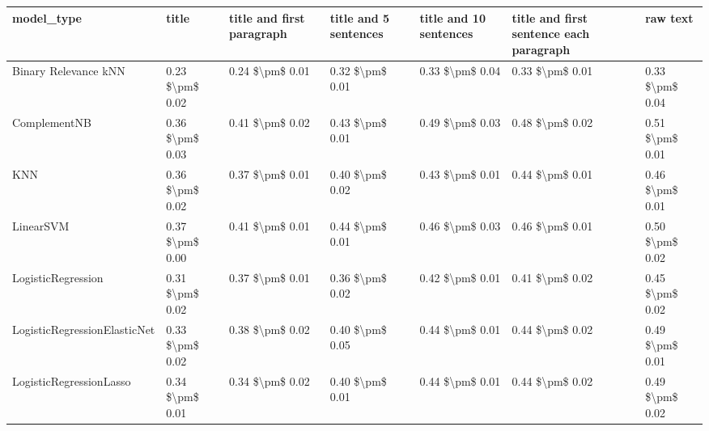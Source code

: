 \begin{tabular}{lllllll}
\toprule
                     model\_type &           title & title and first paragraph & title and 5 sentences & title and 10 sentences & title and first sentence each paragraph &            raw text \\
\midrule
           Binary Relevance kNN & 0.23 \$\textbackslash pm\$ 0.02 &           0.24 \$\textbackslash pm\$ 0.01 &       0.32 \$\textbackslash pm\$ 0.01 &        0.33 \$\textbackslash pm\$ 0.04 &                         0.33 \$\textbackslash pm\$ 0.01 &     0.33 \$\textbackslash pm\$ 0.04 \\
                   ComplementNB & 0.36 \$\textbackslash pm\$ 0.03 &           0.41 \$\textbackslash pm\$ 0.02 &       0.43 \$\textbackslash pm\$ 0.01 &        0.49 \$\textbackslash pm\$ 0.03 &                         0.48 \$\textbackslash pm\$ 0.02 &     0.51 \$\textbackslash pm\$ 0.01 \\
                            KNN & 0.36 \$\textbackslash pm\$ 0.02 &           0.37 \$\textbackslash pm\$ 0.01 &       0.40 \$\textbackslash pm\$ 0.02 &        0.43 \$\textbackslash pm\$ 0.01 &                         0.44 \$\textbackslash pm\$ 0.01 &     0.46 \$\textbackslash pm\$ 0.01 \\
                      LinearSVM & 0.37 \$\textbackslash pm\$ 0.00 &           0.41 \$\textbackslash pm\$ 0.01 &       0.44 \$\textbackslash pm\$ 0.01 &        0.46 \$\textbackslash pm\$ 0.03 &                         0.46 \$\textbackslash pm\$ 0.01 &     0.50 \$\textbackslash pm\$ 0.02 \\
             LogisticRegression & 0.31 \$\textbackslash pm\$ 0.02 &           0.37 \$\textbackslash pm\$ 0.01 &       0.36 \$\textbackslash pm\$ 0.02 &        0.42 \$\textbackslash pm\$ 0.01 &                         0.41 \$\textbackslash pm\$ 0.02 &     0.45 \$\textbackslash pm\$ 0.02 \\
   LogisticRegressionElasticNet & 0.33 \$\textbackslash pm\$ 0.02 &           0.38 \$\textbackslash pm\$ 0.02 &       0.40 \$\textbackslash pm\$ 0.05 &        0.44 \$\textbackslash pm\$ 0.01 &                         0.44 \$\textbackslash pm\$ 0.02 &     0.49 \$\textbackslash pm\$ 0.01 \\
        LogisticRegressionLasso & 0.34 \$\textbackslash pm\$ 0.01 &           0.34 \$\textbackslash pm\$ 0.02 &       0.40 \$\textbackslash pm\$ 0.01 &        0.44 \$\textbackslash pm\$ 0.01 &                         0.44 \$\textbackslash pm\$ 0.02 &     0.49 \$\textbackslash pm\$ 0.02 \\

\end{tabular}
